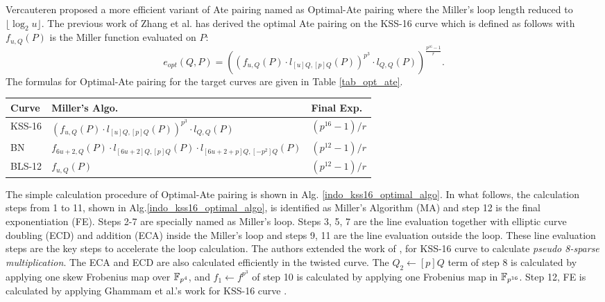 Vercauteren proposed a more efficient variant of Ate pairing named as Optimal-Ate pairing \cite{DBLP:journals/tit/Vercauteren10} where the Miller's loop length reduced to $\lfloor \log_2 u \rfloor$.
The previous work of Zhang et al. \cite{INDOCRYPT:ZhaLin12} has derived the optimal Ate pairing on the KSS-16 curve which is defined as follows with $f_{u,Q}(P)$ is the Miller function evaluated on $P$:
\begin{equation}
e_{opt}(Q,P)=((f_{u,Q}(P)\cdot l_{[u]Q,[p]Q}(P))^{p^3}\cdot l_{Q,Q}(P))^{\frac{p^{16}-1}{r}}.
\end{equation}
The formulas for Optimal-Ate pairing for the target curves are given in Table \ref{tab_opt_ate}. 
\renewcommand{\baselinestretch}{1.5}
\begin{table*}[ht]
	\centering
	\caption{Optimal-Ate pairing formulas for target curves.}
	\label{tab_opt_ate}
	\begin{tabular}{|l|l|l|}
		\hline
		Curve  & Miller's Algo.                                                             & Final Exp.             \\ \hline
		KSS-16 & $(f_{u,Q}(P)\cdot l_{[u]Q,[p]Q}(P))^{p^3}\cdot l_{Q,Q}(P)$                        & $(p^{16}-1)/r$ \\ \hline
		BN     & $f_{6u+2,Q}(P )\cdot l_{[6u+2]Q,[p]Q} (P ) \cdot l_{[6u+2+p]Q,[-p^2]Q} (P)$ & $(p^{12}-1)/r$         \\ \hline
		BLS-12 & $f_{u,Q}(P )$                                                              & $(p^{12}-1)/r$       \\ \hline
	\end{tabular}
\end{table*}
\renewcommand{\baselinestretch}{1.0}

The simple calculation procedure of Optimal-Ate pairing is shown in Alg. \ref{indo_kss16_optimal_algo}.
In what follows, the calculation steps from 1 to 11, shown in Alg.\ref{indo_kss16_optimal_algo}, is identified as Miller's Algorithm (MA) and step 12 is the final exponentiation (FE).
Steps 2-7 are specially named as Miller's loop.
Steps 3, 5, 7 are the line evaluation together with elliptic curve doubling (ECD) and addition (ECA) inside the Miller's loop and steps 9, 11 are the line evaluation outside the loop.
These line evaluation steps are the key steps to accelerate the loop calculation. 
The authors extended the work of \cite{PAIRING:MANS13},\cite{ICISC:KONSD16} for KSS-16 curve to calculate \textit{pseudo 8-sparse multiplication}.
The ECA and ECD are also calculated efficiently in the twisted curve. 
The $Q_2 \leftarrow [p]Q$ term of step 8 is calculated by applying one skew Frobenius map over $\mathbb{F}_{p^4}$, and $f_1\leftarrow f^{p^3}$ of step 10 is calculated by applying one Frobenius map in $\mathbb{F}_{p^{16}}$. 
Step 12, FE is calculated by applying Ghammam et al.'s work for KSS-16 curve \cite{EPRINT:GhaFou16b}.

